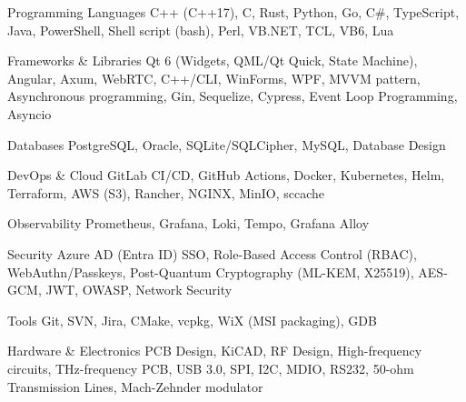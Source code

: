 
\begin{cvskills}

  \cvskill
    {Programming Languages} %
      {C++ (C++17), C, Rust, Python, Go, C\#, TypeScript, Java, PowerShell, Shell script (bash), Perl, VB.NET, TCL, VB6, Lua} %

  \cvskill
    {Frameworks \& Libraries} %
      {Qt 6 (Widgets, QML/Qt Quick, State Machine), Angular, Axum, WebRTC, C++/CLI, WinForms, WPF, MVVM pattern, Asynchronous programming, Gin, Sequelize, Cypress, Event Loop Programming, Asyncio} %

  \cvskill
    {Databases} %
      {PostgreSQL, Oracle, SQLite/SQLCipher, MySQL, Database Design} %

  \cvskill
    {DevOps \& Cloud} %
      {GitLab CI/CD, GitHub Actions, Docker, Kubernetes, Helm, Terraform, AWS (S3), Rancher, NGINX, MinIO, sccache} %

  \cvskill
    {Observability} %
      {Prometheus, Grafana, Loki, Tempo, Grafana Alloy} %

  \cvskill
    {Security} %
      {Azure AD (Entra ID) SSO, Role-Based Access Control (RBAC), WebAuthn/Passkeys, Post-Quantum Cryptography (ML-KEM, X25519), AES-GCM, JWT, OWASP, Network Security} %

  \cvskill
    {Tools} %
    {Git, SVN, Jira, CMake, vcpkg, WiX (MSI packaging), GDB} %

  \cvskill
    {Hardware \& Electronics} %
    {PCB Design, KiCAD, RF Design, High-frequency circuits, THz-frequency PCB, USB 3.0, SPI, I2C, MDIO, RS232, 50-ohm Transmission Lines, Mach-Zehnder modulator} %


\end{cvskills}
